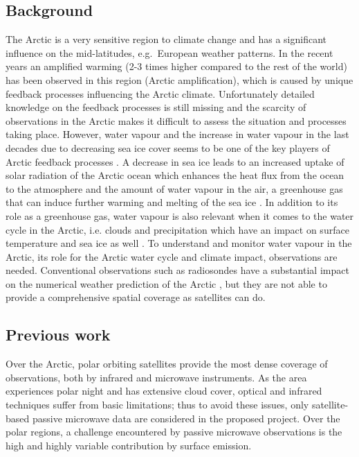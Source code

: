 \documentclass[12pt,oneside,a4paper]{article}
\begin{document}
\subsection{Background}
%
\label{sec:background}
The Arctic is a very sensitive region to climate change and has a significant
influence on the mid-latitudes, e.g.\ European weather patterns. In the recent
years an amplified warming (2-3 times higher compared to the rest of the world)
has been observed in this region (Arctic amplification), which is caused by
unique feedback processes influencing the Arctic climate. Unfortunately
detailed knowledge on the feedback processes is still missing and the scarcity
of observations in the Arctic makes it difficult to assess the situation and
processes taking place. However, water vapour and the increase in water vapour
in the last decades due to decreasing sea ice cover seems to be one of the key
players of Arctic feedback processes \citep[e.g.][]{ vihma:2016:theat}. A decrease in sea ice leads to an increased uptake of solar
radiation of the Arctic ocean which enhances the heat flux from the ocean to
the atmosphere and the amount of water vapour in the air, a greenhouse gas that
can induce further warming and melting of the sea ice \citep{screen:2010:thece}. In
addition to its role as a greenhouse gas, water vapour is also relevant when it
comes to the water cycle in the Arctic, i.e. clouds and precipitation which
have an impact on surface temperature and sea ice as well
\citep{blanchet:water:1995}. To understand and monitor water vapour in the
Arctic, its role for the Arctic water cycle and climate impact,  observations
are needed. Conventional observations such as radiosondes have a substantial
impact on the numerical weather prediction of the Arctic
\citep{lawrence:2019:usean}, but they are not able to provide a comprehensive
spatial coverage as satellites can do.

\subsection{Previous work}
%
\label{sec:previousworks}
%
Over the Arctic, polar orbiting satellites provide the most dense coverage
of observations, both by infrared and microwave instruments. As the area
experiences polar night and has extensive cloud cover, optical and infrared
techniques suffer from basic limitations; thus to avoid these issues, only
satellite-based passive microwave data are considered in the proposed project. Over the polar regions, a challenge encountered by passive microwave observations is the high and highly variable contribution by surface emission.
\end{document}
